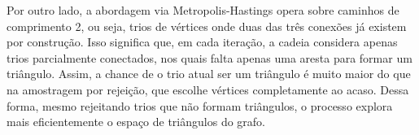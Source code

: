\begin{itemize}
\begin{resposta}
    Por outro lado, a abordagem via Metropolis-Hastings opera sobre caminhos de comprimento 2, ou seja, trios de vértices onde duas das três conexões já existem por construção. Isso significa que, em cada iteração, a cadeia considera apenas trios parcialmente conectados, nos quais falta apenas uma aresta para formar um triângulo. Assim, a chance de o trio atual ser um triângulo é muito maior do que na amostragem por rejeição, que escolhe vértices completamente ao acaso. Dessa forma, mesmo rejeitando trios que não formam triângulos, o processo explora mais eficientemente o espaço de triângulos do grafo.
\end{resposta}

\end{itemize}

